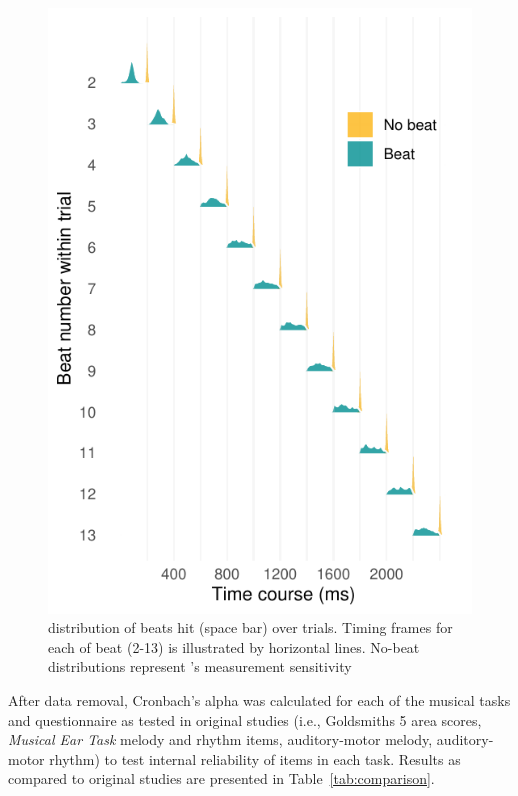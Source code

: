\documentclass[a4paper]{article}
\begin{document}
\begin{figure}[t]
  \centering
  \includegraphics[width=\linewidth]{SP_24_visuals/Correct_and_Incorrect_distrubutions_by_beat_across_trial.pdf}
  \caption{distribution of beats hit (space bar) over trials. Timing frames for each of beat (2-13) is illustrated by horizontal lines. No-beat distributions represent \cite{gorilla_Anwyl-Irvine_2019}'s measurement sensitivity}
  \label{fig:beat_data}
\end{figure}

After data removal, Cronbach's alpha was calculated for each of the musical tasks and questionnaire as tested in original studies (i.e., Goldsmiths 5 area scores, \textit{Musical Ear Task} melody and rhythm items, auditory-motor melody, auditory-motor rhythm) to test internal reliability of items in each task. Results as compared to original studies are presented in Table~\ref{tab:comparison}. 
\end{document}
